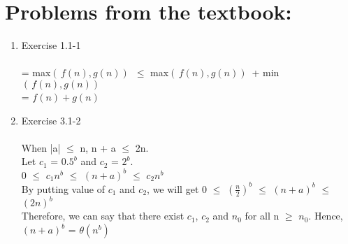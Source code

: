 \documentclass{article}
\begin{document}
\section{Problems from the textbook:}
\begin{enumerate}
    \item Exercise 1.1-1\\\\
    = max$( \,f(n),g(n)) \,$ $\leq$  max$( \,f(n),g(n)) \,$ + min$( \,f(n),g(n)) \,$ \\
    = $f(n) + g(n)$\\
    \item Exercise 3.1-2\\\\
    When |a| $\leq$ n, n + a $\leq$ 2n.\\
    Let $c_1$ = $0.5^b$ and $c_2$ = $2^b$.\\
    0 $\leq$ $c_1 n^b$ $\leq$ $(n+a)^b$  $\leq$ $c_2 n^b$ \\
    By putting value of $c_1$ and $c_2$, we will get 0 $\leq$ $(\frac{n}{2})^b$ $\leq$ $(n+a)^b$  $\leq$ $(2n)^b$\\
    Therefore, we can say that there exist $c_1$, $c_2$ and $n_0$ for all n $\geq$ $n_0$. Hence, $(n+a)^b$ = $\theta(n^b)$ 


\end{enumerate}
\end{document}
